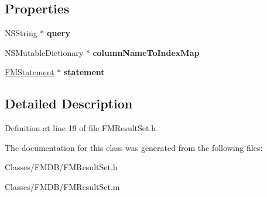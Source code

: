 \subsection*{Properties}
\begin{DoxyCompactItemize}
\item 
\hypertarget{interface_f_m_result_set_a936eb1d8a837ce00b5f6bde653f8901e}{
NSString $\ast$ {\bfseries query}}
\label{interface_f_m_result_set_a936eb1d8a837ce00b5f6bde653f8901e}

\item 
\hypertarget{interface_f_m_result_set_a05dc479f9646728b19287a6251ee9303}{
NSMutableDictionary $\ast$ {\bfseries columnNameToIndexMap}}
\label{interface_f_m_result_set_a05dc479f9646728b19287a6251ee9303}

\item 
\hypertarget{interface_f_m_result_set_a830e852657af659f38a4a541edae0a4e}{
\hyperlink{interface_f_m_statement}{FMStatement} $\ast$ {\bfseries statement}}
\label{interface_f_m_result_set_a830e852657af659f38a4a541edae0a4e}

\end{DoxyCompactItemize}


\subsection{Detailed Description}


Definition at line 19 of file FMResultSet.h.



The documentation for this class was generated from the following files:\begin{DoxyCompactItemize}
\item 
Classes/FMDB/FMResultSet.h\item 
Classes/FMDB/FMResultSet.m\end{DoxyCompactItemize}
